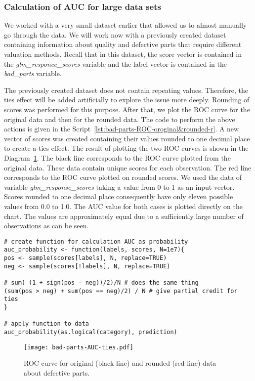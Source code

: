 \documentclass[]{scrreprt}
\begin{document}
\subsubsection{Calculation of AUC for large data sets}
We worked with a very small dataset earlier that allowed us to almost manually go through the data. We will work now with a previously created dataset containing information about quality and defective parts that require different valuation methods. Recall that in this dataset, the score vector is contained in the \textit{glm\_responce\_scores} variable and the label vector is contained in the \textit{bad\_parts} variable.

The previously created dataset does not contain repeating values. Therefore, the ties effect will be added artificially to explore the issue more deeply. Rounding of scores was performed for this purpose. After that, we plot the ROC curve for the original data and then for the rounded data. The code to perform the above actions is given in the Script~\ref{lst:bad-parts-ROC-oroginal&rounded-r}. A new vector of scores was created containing their values rounded to one decimal place to create a ties effect. The result of plotting the two ROC curves is shown in the Diagram~\ref{fig:bad-parts-ROC-original&rounded-r}. The black line corresponds to the ROC curve plotted from the original data. These data contain unique scores for each observation. The red line corresponds to the ROC curve plotted on rounded scores. We used the data of variable \textit{glm\_response\_scores} taking a value from 0 to 1 as an input vector. Scores rounded to one decimal place consequently have only eleven possible values from 0.0 to 1.0. The AUC value for both cases is plotted directly on the chart. The values are approximately equal due to a sufficiently large number of observations as can be seen.
%
\begin{lstlisting}[float=htp, caption = Plotting the ROC curve on the original (black line) and rounded (red line) defective parts data, firstnumber=1, label= lst:bad-parts-ROC-oroginal&rounded-r]
# create function for calculation AUC as probability
auc_probability <- function(labels, scores, N=1e7){
pos <- sample(scores[labels], N, replace=TRUE)
neg <- sample(scores[!labels], N, replace=TRUE)

# sum( (1 + sign(pos - neg))/2)/N # does the same thing
(sum(pos > neg) + sum(pos == neg)/2) / N # give partial credit for ties
}

# apply function to data
auc_probability(as.logical(category), prediction)
\end{lstlisting}
%
\begin{figure}[htp]
	\centering
	\texttt{[image: bad-parts-AUC-ties.pdf]}
	\caption{ROC curve for original (black line) and rounded (red line) data about defective parts.}
	\label{fig:bad-parts-ROC-original&rounded-r}
\end{figure}
%
\end{document}
